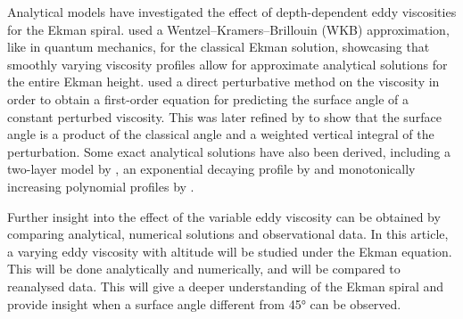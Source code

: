 Analytical models have investigated the effect of depth-dependent eddy viscosities for the Ekman spiral. \citet{grisogono1995} used a Wentzel--Kramers--Brillouin (WKB) approximation, like in quantum mechanics, for the classical Ekman solution, showcasing that smoothly varying viscosity profiles allow for approximate analytical solutions for the entire Ekman height. \citet{bressan2019} used a direct perturbative method on the viscosity in order to obtain a first-order equation for predicting the surface angle of a constant perturbed viscosity. This was later refined by \citet{constantin2021} to show that the surface angle is a product of the classical angle and a weighted vertical integral of the perturbation. Some exact analytical solutions have also been derived, including a two-layer model by \citet{dritschel2020, guan2023}, an exponential decaying profile by \citet{miles1994} and monotonically increasing polynomial profiles by \citet{ionescu-kruse2021,guan2023}.

Further insight into the effect of the variable eddy viscosity can be obtained by comparing analytical, numerical solutions and observational data. In this article, a varying eddy viscosity with altitude will be studied under the Ekman equation. This will be done analytically and numerically, and will be compared to reanalysed data. This will give a deeper understanding of the Ekman spiral and provide insight when a surface angle different from \ang{45} can be observed.